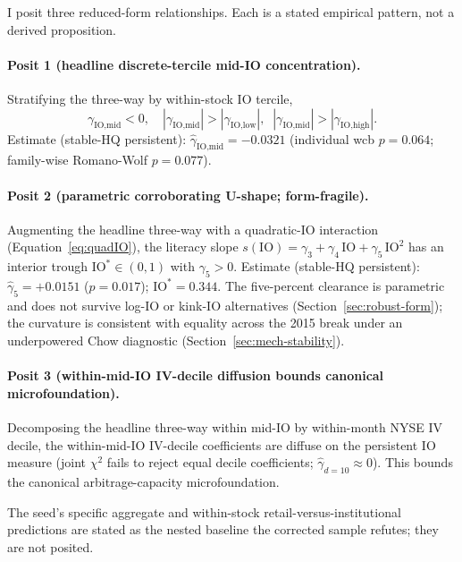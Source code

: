 I posit three reduced-form relationships. Each is a stated empirical pattern, not a derived proposition.

\paragraph{Posit 1 (headline discrete-tercile mid-IO concentration).} Stratifying the three-way by within-stock IO tercile,
\begin{equation}
\label{eq:posit1}
\gamma_{\text{IO,mid}} < 0,\quad |\gamma_{\text{IO,mid}}| > |\gamma_{\text{IO,low}}|,\;\; |\gamma_{\text{IO,mid}}| > |\gamma_{\text{IO,high}}|.
\end{equation}
Estimate (stable-HQ persistent): $\hat\gamma_{\text{IO,mid}} = -0.0321$ (individual wcb $p = 0.064$; family-wise Romano-Wolf $p = 0.077$).

\paragraph{Posit 2 (parametric corroborating U-shape; form-fragile).} Augmenting the headline three-way with a quadratic-IO interaction (Equation~\ref{eq:quadIO}), the literacy slope $s(\mathrm{IO}) = \gamma_{3} + \gamma_{4}\,\mathrm{IO} + \gamma_{5}\,\mathrm{IO}^{2}$ has an interior trough $\mathrm{IO}^{\ast} \in (0,1)$ with $\gamma_{5} > 0$. Estimate (stable-HQ persistent): $\hat\gamma_{5} = +0.0151$ ($p = 0.017$); $\mathrm{IO}^{\ast} = 0.344$. The five-percent clearance is parametric and does not survive log-IO or kink-IO alternatives (Section~\ref{sec:robust-form}); the curvature is consistent with equality across the 2015 break under an underpowered Chow diagnostic (Section~\ref{sec:mech-stability}).

\paragraph{Posit 3 (within-mid-IO IV-decile diffusion bounds canonical microfoundation).} Decomposing the headline three-way within mid-IO by within-month NYSE IV decile, the within-mid-IO IV-decile coefficients are diffuse on the persistent IO measure (joint $\chi^{2}$ fails to reject equal decile coefficients; $\hat\gamma_{d=10} \approx 0$). This bounds the canonical arbitrage-capacity microfoundation.

The seed's specific aggregate and within-stock retail-versus-institutional predictions are stated as the nested baseline the corrected sample refutes; they are not posited.
